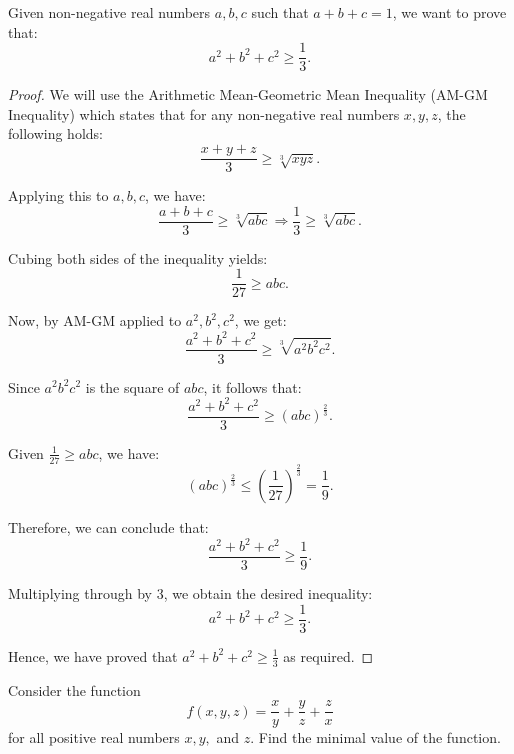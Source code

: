 \documentclass[
	12pt, %
	fleqn, %
	a4paper, %
]{LegrandOrangeBook}
\begin{document}
\begin{exercise}
    Given non-negative real numbers \( a, b, c \) such that \( a + b + c = 1 \), we want to prove that:
\[ a^2 + b^2 + c^2 \geq \frac{1}{3}. \]
\end{exercise}
\begin{proof}
    We will use the Arithmetic Mean-Geometric Mean Inequality (AM-GM Inequality) which states that for any non-negative real numbers \( x, y, z \), the following holds:
\[ \frac{x + y + z}{3} \geq \sqrt[3]{xyz}. \]

Applying this to \( a, b, c \), we have:
\[ \frac{a + b + c}{3} \geq \sqrt[3]{abc} \Rightarrow \frac{1}{3} \geq \sqrt[3]{abc}. \]

Cubing both sides of the inequality yields:
\[ \frac{1}{27} \geq abc. \]

Now, by AM-GM applied to \( a^2, b^2, c^2 \), we get:
\[ \frac{a^2 + b^2 + c^2}{3} \geq \sqrt[3]{a^2b^2c^2}. \]

Since \( a^2b^2c^2 \) is the square of \( abc \), it follows that:
\[ \frac{a^2 + b^2 + c^2}{3} \geq (abc)^{\frac{2}{3}}. \]

Given \( \frac{1}{27} \geq abc \), we have:
\[ (abc)^{\frac{2}{3}} \leq \left(\frac{1}{27}\right)^{\frac{2}{3}} = \frac{1}{9}. \]

Therefore, we can conclude that:
\[ \frac{a^2 + b^2 + c^2}{3} \geq \frac{1}{9}. \]

Multiplying through by 3, we obtain the desired inequality:
\[ a^2 + b^2 + c^2 \geq \frac{1}{3}. \]

Hence, we have proved that \( a^2 + b^2 + c^2 \geq \frac{1}{3} \) as required.
\end{proof}

\begin{exercise}
    Consider the function
    \[
    f(x, y, z) = \frac{x}{y} + \frac{y}{z} + \frac{z}{x}
    \]
    for all positive real numbers \( x, y, \) and \( z \). Find the minimal value of the function.
    \end{exercise}
    
\end{document}
